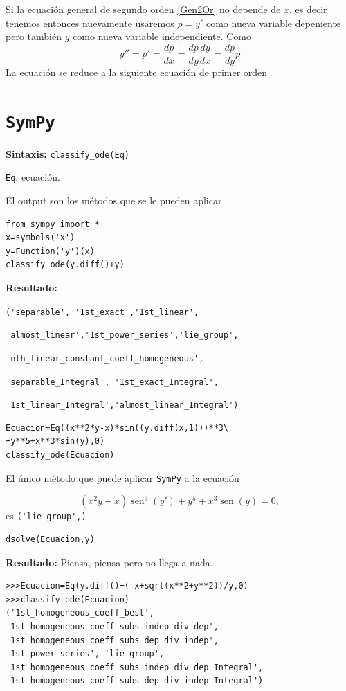 \documentclass{article}
\DeclareMathOperator{\sen}{sen}
\begin{document}
Si la ecuación general de segundo orden \eqref{Gen2Or} no depende de $x$, es decir tenemos
entonces nuevamente usaremos $\boxed{p=y'}$ como nueva variable depeniente
pero también  $\boxed{y}$ como nueva variable independiente. Como
\[y''=p'=\frac{dp}{dx}=\frac{dp}{dy}\frac{dy}{dx}=\frac{dp}{dy}p\]
La ecuación se reduce a la siguiente ecuación de primer orden



\section{\texttt{SymPy}}



\begin{codigo}
\textbf{Sintaxis:} \verb+classify_ode(Eq)+

\verb+Eq+:  ecuación.

\end{codigo}
El output son los métodos que se le pueden aplicar
\begin{lstlisting}
from sympy import *
x=symbols('x')
y=Function('y')(x)
classify_ode(y.diff()+y)
\end{lstlisting}
\noindent\textbf{Resultado:}

\verb+('separable', '1st_exact','1st_linear',+

\verb+'almost_linear','1st_power_series','lie_group',+


\verb+'nth_linear_constant_coeff_homogeneous', +

\verb+'separable_Integral', '1st_exact_Integral',  +

\verb+'1st_linear_Integral','almost_linear_Integral')+

\begin{lstlisting}
Ecuacion=Eq((x**2*y-x)*sin((y.diff(x,1)))**3\
+y**5+x**3*sin(y),0)
classify_ode(Ecuacion)
\end{lstlisting}

El único método que puede aplicar \texttt{SymPy} a la ecuación 

\[(x^ 2y-x)\sen^ 3(y')+y^ 5+x^3\sen(y)=0,\]
es \verb+('lie_group',)+
\begin{lstlisting}
dsolve(Ecuacion,y)
\end{lstlisting}
 \noindent\textbf{Resultado:} Piensa, piensa   pero no llega a nada.

\begin{lstlisting}
>>>Ecuacion=Eq(y.diff()+(-x+sqrt(x**2+y**2))/y,0)
>>>classify_ode(Ecuacion)
('1st_homogeneous_coeff_best', 
'1st_homogeneous_coeff_subs_indep_div_dep', 
'1st_homogeneous_coeff_subs_dep_div_indep', 
'1st_power_series', 'lie_group', 
'1st_homogeneous_coeff_subs_indep_div_dep_Integral', 
'1st_homogeneous_coeff_subs_dep_div_indep_Integral')
\end{lstlisting}
\end{document}

